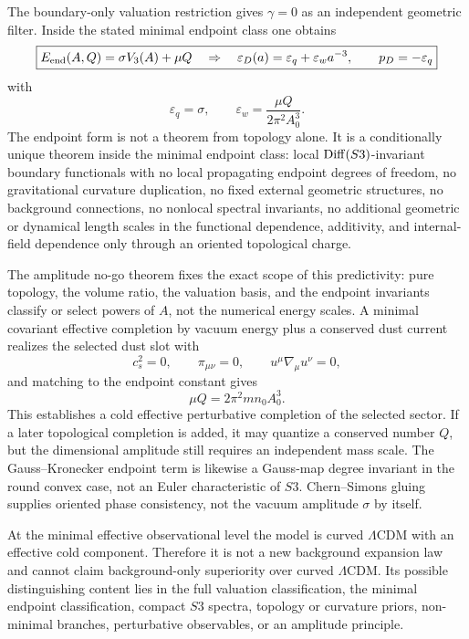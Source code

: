 \documentclass[11pt,a4paper]{article}
\def\Sthree{S3}%
\numberwithin{equation}{section}
\theoremstyle{remark}
\newcommand{\Sthree}{S^3}
\newcommand{\epsD}{\varepsilon_D}
\newcommand{\pD}{p_D}
\begin{document}
The boundary-only valuation restriction gives \(\gamma=0\) as an independent geometric filter. Inside the stated minimal endpoint class one obtains
\begin{equation}
\boxed{
E_{\rm end}(A,Q)=\sigma V_3(A)+\mu Q
\quad\Rightarrow\quad
\epsD(a)=\varepsilon_q+\varepsilon_w a^{-3},
\qquad
\pD=-\varepsilon_q
}
\end{equation}
with
\begin{equation}
\varepsilon_q=\sigma,
\qquad
\varepsilon_w=\frac{\mu Q}{2\pi^2A_0^3}.
\end{equation}
The endpoint form is not a theorem from topology alone. It is a conditionally unique theorem inside the minimal endpoint class: local \({\rm Diff}(\Sthree)\)-invariant boundary functionals with no local propagating endpoint degrees of freedom, no gravitational curvature duplication, no fixed external geometric structures, no background connections, no nonlocal spectral invariants, no additional geometric or dynamical length scales in the functional dependence, additivity, and internal-field dependence only through an oriented topological charge.

The amplitude no-go theorem fixes the exact scope of this predictivity: pure topology, the volume ratio, the valuation basis, and the endpoint invariants classify or select powers of \(A\), not the numerical energy scales. A minimal covariant effective completion by vacuum energy plus a conserved dust current realizes the selected dust slot with
\begin{equation}
c_s^2=0,
\qquad
\pi_{\mu\nu}=0,
\qquad
u^\mu\nabla_\mu u^\nu=0,
\end{equation}
and matching to the endpoint constant gives
\begin{equation}
\mu Q=2\pi^2mn_0A_0^3.
\end{equation}
This establishes a cold effective perturbative completion of the selected sector. If a later topological completion is added, it may quantize a conserved number \(Q\), but the dimensional amplitude still requires an independent mass scale. The Gauss--Kronecker endpoint term is likewise a Gauss-map degree invariant in the round convex case, not an Euler characteristic of \(\Sthree\). Chern--Simons gluing supplies oriented phase consistency, not the vacuum amplitude \(\sigma\) by itself.

At the minimal effective observational level the model is curved \(\Lambda\)CDM with an effective cold component. Therefore it is not a new background expansion law and cannot claim background-only superiority over curved \(\Lambda\)CDM. Its possible distinguishing content lies in the full valuation classification, the minimal endpoint classification, compact \(\Sthree\) spectra, topology or curvature priors, non-minimal branches, perturbative observables, or an amplitude principle.
\end{document}
